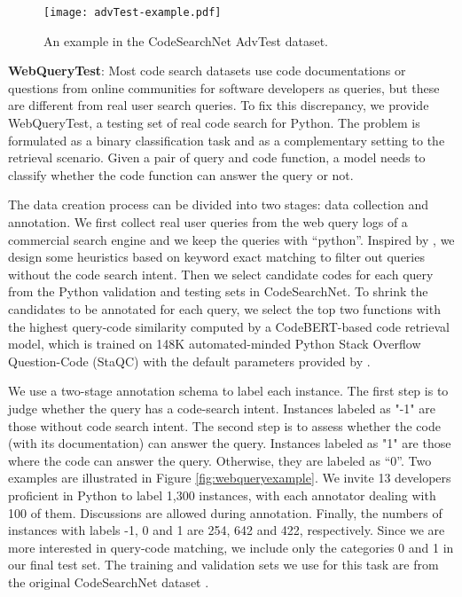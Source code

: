 \documentclass[sigconf,nonacm,screen]{acmart}
\begin{document}
\begin{figure}[h]
    \texttt{[image: advTest-example.pdf]}
    \caption{An example in the CodeSearchNet AdvTest dataset.}
    \label{fig:advTest-example}
\end{figure}

\textbf{WebQueryTest}: Most code search datasets use code documentations or questions from online communities for software developers as queries, but these are  different from real user search queries. To fix this discrepancy, we provide WebQueryTest, a testing set of real code search for Python. The problem is formulated as a binary classification task  and as a complementary setting to the retrieval scenario. Given a pair of query and code function, a model needs to classify whether the code function can answer the query or not. 

The data creation process can be divided into two stages: data collection and annotation.
We first collect real user queries from the web query logs of a commercial search engine and we keep the queries with ``python''. 
Inspired by \citet{yan2020searchintent}, we design some heuristics based on keyword  exact matching to filter out queries without the code search intent.
Then we select candidate codes for each query from the Python validation and testing sets in CodeSearchNet. To shrink the candidates to be annotated for each query, we select the top two functions with the highest query-code similarity computed by a CodeBERT-based code retrieval model, which is trained on 148K automated-minded Python Stack Overflow Question-Code (StaQC) \cite{yao2018staqc} with the default parameters provided by \citet{feng2020codebert}. 

We use a two-stage annotation schema to label each instance. The first step is to judge whether the query has a code-search intent. Instances labeled as "-1" are those without code search intent. The second step is to assess whether the code (with its documentation) can answer the query. 
Instances labeled as "1" are those where the code can answer the query. Otherwise, they are labeled as  ``0''. Two examples are illustrated in Figure \ref{fig:webqueryexample}. We invite 13 developers proficient in Python to label 1,300 instances, with each annotator dealing with 100 of them. Discussions are allowed during annotation. Finally, the numbers of instances with labels -1, 0 and 1 are 254, 642 and 422, respectively. Since we are more interested in query-code matching, we include only the categories 0 and 1 in our final test set. 
The training and validation sets we use for this task are from the original CodeSearchNet dataset \cite{husain2019codesearchnet}.
\end{document}
